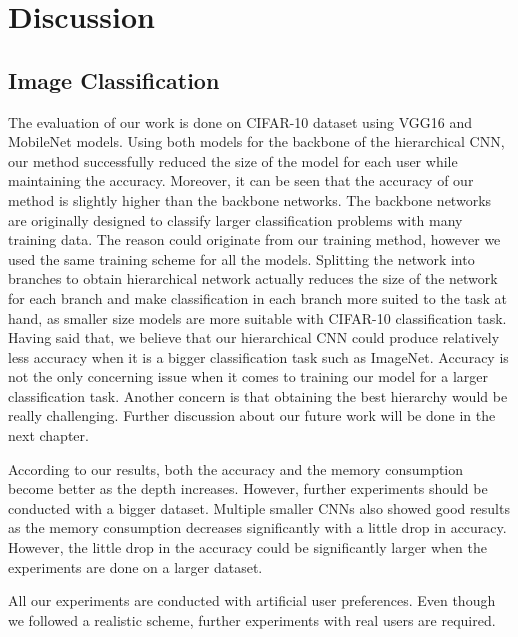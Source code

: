 \lhead[\chaptername~\thechapter]{\rightmark}

\rhead[\leftmark]{}

\lfoot[\thepage]{}

\cfoot{}

\rfoot[]{\thepage}

\chapter{Discussion}
\label{discussion}

\section*{Image Classification}

The evaluation of our work is done on CIFAR-10 dataset using VGG16 and MobileNet models. 
Using both models for the backbone of the hierarchical CNN, our method successfully reduced the size of the model for each user while maintaining the accuracy. 
Moreover, it can be seen that the accuracy of our method is slightly higher than the backbone networks.
The backbone networks are originally designed to classify larger classification problems with many training data. 
The reason could originate from our training method, however we used the same training scheme for all the models. 
Splitting the network into branches to obtain hierarchical network actually reduces the size of the network for each branch and make classification in each branch more suited to the task at hand, as smaller size models are more suitable with CIFAR-10 classification task.
Having said that, we believe that our hierarchical CNN could produce relatively less accuracy when it is a bigger classification task such as ImageNet. 
Accuracy is not the only concerning issue when it comes to training our model for a larger classification task. 
Another concern is that obtaining the best hierarchy would be really challenging. Further discussion about our future work will be done in the next chapter.

According to our results, both the accuracy and the memory consumption become better as the depth increases. However, further experiments should be conducted with a bigger dataset. 
Multiple smaller CNNs also showed good results as the memory consumption decreases significantly with a little drop in accuracy. 
However, the little drop in the accuracy could be significantly larger when the experiments are done on a larger dataset.

All our experiments are conducted with artificial user preferences. Even though we followed a realistic scheme, further experiments with real users are required. 

